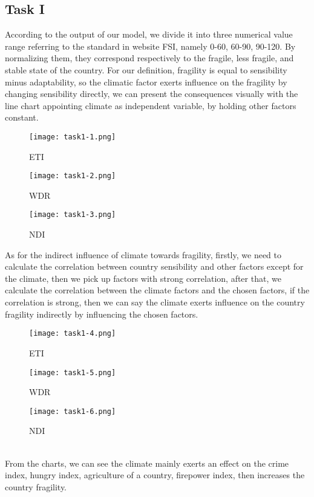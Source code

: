 \documentclass{mcmthesis}
\begin{document}
\subsection{Task I}
According to the output of our model, we divide it into 
three numerical value range referring to the standard in website 
FSI, namely 0-60, 60-90, 90-120. By normalizing them, they 
correspond respectively to the fragile, less fragile, and stable 
state of the country. For our definition, fragility is equal to 
sensibility minus adaptability, so the climatic factor exerts 
influence on the fragility by changing sensibility directly, 
we can present the consequences visually with the line chart 
appointing climate as independent variable, by holding other 
factors constant. 
\begin{figure}[h]
  \centering
  \begin{minipage}[h]{0.3\textwidth}
  \centering
  \texttt{[image: task1-1.png]}
  \caption{ETI}
  \end{minipage}
  \begin{minipage}[h]{0.3\textwidth}
  \centering
  \texttt{[image: task1-2.png]}
  \caption{WDR}
  \end{minipage}    
  \begin{minipage}[h]{0.3\textwidth}
  \centering
  \texttt{[image: task1-3.png]}
  \caption{NDI}
  \end{minipage}  
\end{figure}
As for the indirect influence of climate towards 
fragility, firstly, we need to calculate the correlation between 
country sensibility and other factors except for the climate, then 
we pick up factors with strong correlation, after that, we 
calculate the correlation between the climate factors and the 
chosen factors, if the correlation is strong, then we can say 
the climate exerts influence on the country fragility indirectly 
by influencing the chosen factors.
\begin{figure}[h]
  \centering
  \begin{minipage}[h]{0.3\textwidth}
  \centering
  \texttt{[image: task1-4.png]}
  \caption{ETI}
  \end{minipage}
  \begin{minipage}[h]{0.3\textwidth}
  \centering
  \texttt{[image: task1-5.png]}
  \caption{WDR}
  \end{minipage}    
  \begin{minipage}[h]{0.3\textwidth}
  \centering
  \texttt{[image: task1-6.png]}
  \caption{NDI}
  \end{minipage}  
\end{figure}\\
From the charts, we can see the climate mainly exerts 
an effect on the crime index, hungry index, agriculture of 
a country, firepower index, then increases the 
country fragility.
\end{document}
